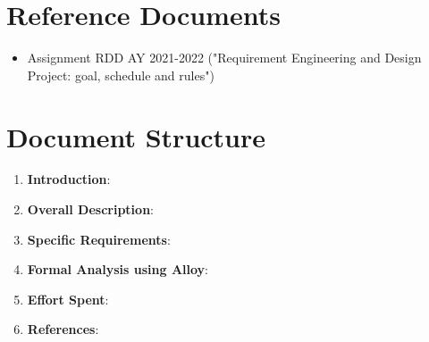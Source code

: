 \section{Reference Documents}

\begin{itemize}
    \item Assignment RDD AY 2021-2022 ("Requirement Engineering and Design Project: goal, schedule and rules")
\end{itemize}

\section{Document Structure}

\begin{enumerate}
    \item \textbf{Introduction}:
    \item \textbf{Overall Description}:
    \item \textbf{Specific Requirements}:
    \item \textbf{Formal Analysis using Alloy}:
    \item \textbf{Effort Spent}:
    \item \textbf{References}:
\end{enumerate}
